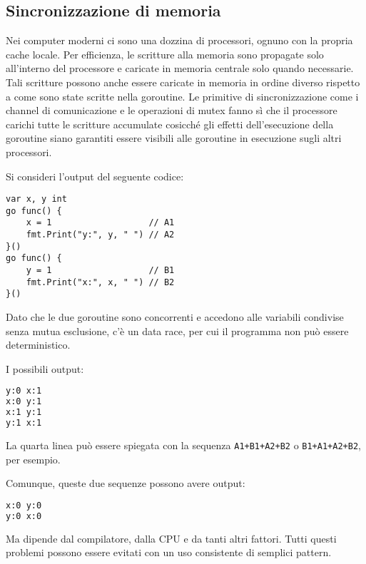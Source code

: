 \documentclass[../../thesis.tex]{subfiles}
\begin{document}
    \subsection{Sincronizzazione di memoria}\label{subsec:sincronizzazione-di-memoria}
    Nei computer moderni ci sono una dozzina di processori, ognuno con la propria cache locale.
    Per efficienza, le scritture alla memoria sono propagate solo all'interno del processore e caricate in memoria centrale solo quando necessarie.
    Tali scritture possono anche essere caricate in memoria in ordine diverso rispetto a come sono state scritte nella goroutine.
    Le primitive di sincronizzazione come i channel di comunicazione e le operazioni di mutex fanno sì che il processore carichi tutte le scritture accumulate cosicché gli effetti dell'esecuzione della goroutine siano garantiti essere visibili alle goroutine in esecuzione sugli altri processori.
    \hfill \vspace{12pt}

    Si consideri l'output del seguente codice:
    \begin{lstlisting}[frame = single,label={lst:lstlisting9-4.1}]
var x, y int
go func() {
    x = 1                   // A1
    fmt.Print("y:", y, " ") // A2
}()
go func() {
    y = 1                   // B1
    fmt.Print("x:", x, " ") // B2
}()
    \end{lstlisting}
    Dato che le due goroutine sono concorrenti e accedono alle variabili condivise senza mutua esclusione, c'è un data race, per cui il programma non può essere deterministico.

    I possibili output:
    \begin{lstlisting}[language = bash, frame = L,label={lst:lstlisting9-4.2}]
y:0 x:1
x:0 y:1
x:1 y:1
y:1 x:1
    \end{lstlisting}
    La quarta linea può essere spiegata con la sequenza \verb"A1+B1+A2+B2" o \verb"B1+A1+A2+B2", per esempio.

    Comunque, queste due sequenze possono avere output:
    \begin{lstlisting}[language = bash, frame = L,label={lst:lstlisting9-4.3}]
x:0 y:0
y:0 x:0
    \end{lstlisting}
    Ma dipende dal compilatore, dalla CPU e da tanti altri fattori.
    Tutti questi problemi possono essere evitati con un uso consistente di semplici pattern.
\end{document}
